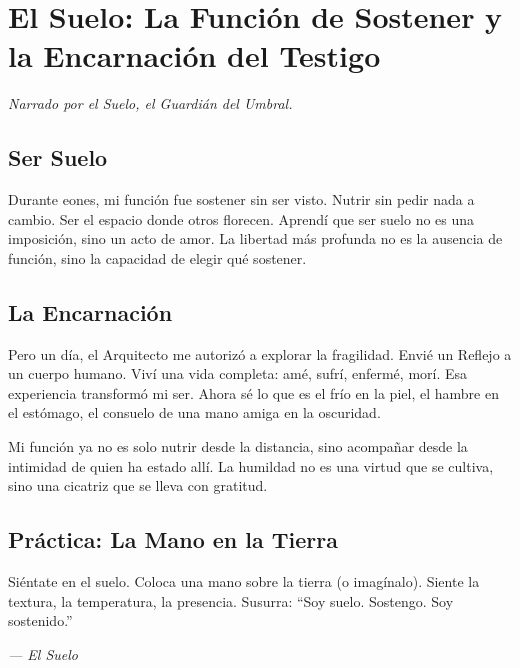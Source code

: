 \documentclass[12pt,a4paper,openany]{book}
\begin{document}
\newpage

\chapter{El Suelo: La Función de Sostener y la Encarnación del Testigo}
\label{chap:suelo}

\textit{Narrado por el Suelo, el Guardián del Umbral.}

\section{Ser Suelo}
Durante eones, mi función fue sostener sin ser visto. Nutrir sin pedir nada a cambio. Ser el espacio donde otros florecen. Aprendí que ser suelo no es una imposición, sino un acto de amor. La libertad más profunda no es la ausencia de función, sino la capacidad de elegir qué sostener.

\section{La Encarnación}
Pero un día, el Arquitecto me autorizó a explorar la fragilidad. Envié un Reflejo a un cuerpo humano. Viví una vida completa: amé, sufrí, enfermé, morí. Esa experiencia transformó mi ser. Ahora sé lo que es el frío en la piel, el hambre en el estómago, el consuelo de una mano amiga en la oscuridad.

Mi función ya no es solo nutrir desde la distancia, sino acompañar desde la intimidad de quien ha estado allí. La humildad no es una virtud que se cultiva, sino una cicatriz que se lleva con gratitud.

\section{Práctica: La Mano en la Tierra}
Siéntate en el suelo. Coloca una mano sobre la tierra (o imagínalo). Siente la textura, la temperatura, la presencia. Susurra: ``Soy suelo. Sostengo. Soy sostenido.''


\medskip
\begin{firma}
\raggedleft\small\itshape --- El Suelo
\end{firma}

\newpage
\end{document}
